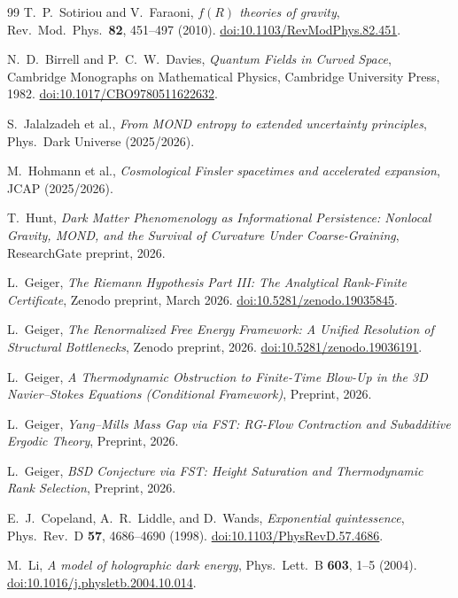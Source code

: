 \documentclass[12pt,a4paper]{article}
\theoremstyle{definition}
\theoremstyle{plain}
\theoremstyle{remark}
\begin{document}
\begin{thebibliography}{99}
T.~P.~Sotiriou and V.~Faraoni,
\textit{$f(R)$ theories of gravity},
Rev.\ Mod.\ Phys.\ \textbf{82}, 451--497 (2010).
\href{https://doi.org/10.1103/RevModPhys.82.451}{doi:10.1103/RevModPhys.82.451}.

N.~D.~Birrell and P.~C.~W.~Davies,
\textit{Quantum Fields in Curved Space},
Cambridge Monographs on Mathematical Physics, Cambridge University Press, 1982.
\href{https://doi.org/10.1017/CBO9780511622632}{doi:10.1017/CBO9780511622632}.

S.~Jalalzadeh et al.,
\textit{From MOND entropy to extended uncertainty principles},
Phys.\ Dark Universe (2025/2026).

M.~Hohmann et al.,
\textit{Cosmological Finsler spacetimes and accelerated expansion},
JCAP (2025/2026).

T.~Hunt,
\textit{Dark Matter Phenomenology as Informational Persistence: Nonlocal Gravity, MOND, and the Survival of Curvature Under Coarse-Graining},
ResearchGate preprint, 2026.

L.~Geiger, \emph{The Riemann Hypothesis Part III: The Analytical Rank-Finite Certificate}, Zenodo preprint, March 2026.
\href{https://doi.org/10.5281/zenodo.19035845}{doi:10.5281/zenodo.19035845}.

L.~Geiger, \emph{The Renormalized Free Energy Framework: A Unified Resolution of Structural Bottlenecks}, Zenodo preprint, 2026.
\href{https://doi.org/10.5281/zenodo.19036191}{doi:10.5281/zenodo.19036191}.

L.~Geiger, \emph{A Thermodynamic Obstruction to Finite-Time Blow-Up in the 3D Navier--Stokes Equations (Conditional Framework)},
Preprint, 2026.

L.~Geiger, \emph{Yang--Mills Mass Gap via FST: RG-Flow Contraction and Subadditive Ergodic Theory},
Preprint, 2026.

L.~Geiger, \emph{BSD Conjecture via FST: Height Saturation and Thermodynamic Rank Selection},
Preprint, 2026.

E.~J.~Copeland, A.~R.~Liddle, and D.~Wands,
\textit{Exponential quintessence},
Phys.\ Rev.\ D \textbf{57}, 4686--4690 (1998).
\href{https://doi.org/10.1103/PhysRevD.57.4686}{doi:10.1103/PhysRevD.57.4686}.

M.~Li,
\textit{A model of holographic dark energy},
Phys.\ Lett.\ B \textbf{603}, 1--5 (2004).
\href{https://doi.org/10.1016/j.physletb.2004.10.014}{doi:10.1016/j.physletb.2004.10.014}.


\end{thebibliography}
\end{document}
